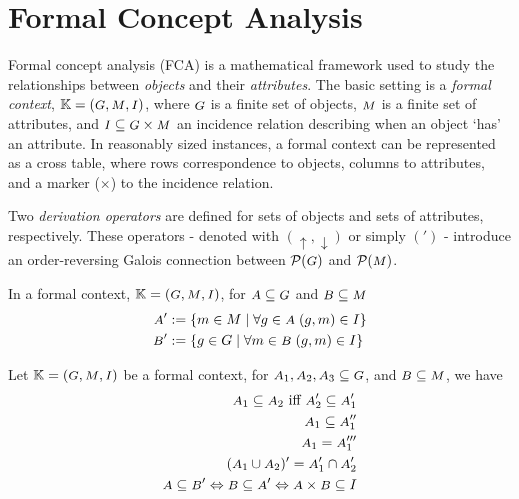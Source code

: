 \section{Formal Concept Analysis}
\label{section—fca}

Formal concept analysis (FCA) is a mathematical framework used to study the relationships between \textit{objects} and their \textit{attributes}. The basic setting is a \textit{formal context}, $\FC$, where $\G$ is a finite set of objects, $\M$ is a finite set of attributes, and $\I \subseteq \G \times \M$ an incidence relation describing when an object `has' an attribute. In reasonably sized instances, a formal context can be represented as a cross table, where rows correspondence to objects, columns to attributes, and a marker ($\times$) to the incidence relation. \cite{Ganter:2004,Ganter:2016,Wille:1996}

Two \textit{derivation operators} are defined for sets of objects and sets of attributes, respectively. These operators - denoted with $(\uparrow, \downarrow)$ or simply $(')$ - introduce an order-reversing Galois connection between $\mathcal{P}(\G)$ and $\mathcal{P}(\M)$.
%
\begin{definition}
    \label{definition derivation-operators}
    In a formal context, $\FC$, for $\A \subseteq \G$ and $\B \subseteq \M$
    \begin{align}
        \A' & := \{m \in M \mid \forall g \in \A \; (g,m) \in I\} \\
        \B' & := \{g \in G \mid \forall m \in \B \; (g,m) \in I\}
    \end{align}
\end{definition}
%
\begin{proposition}
    \label{propistion: properties of derivation operators}
    Let $\FC$ be a formal context, for $\A_1, \A_2, \A_3 \subseteq \G$, and $\B \subseteq \M$, we have
    \begin{align}
        \A_1 \subseteq \A_2 \text{ iff } \A_2' \subseteq \A_1' \\
        \A_1 \subseteq \A_1''                                  \\
        \A_1 = \A_1'''                                         \\
        (\A_1 \cup \A_2)' = \A_1' \cap \A_2'                   \\
        \A \subseteq \B' \Leftrightarrow \B \subseteq \A' \Leftrightarrow \A \times \B \subseteq I
    \end{align}
\end{proposition}

